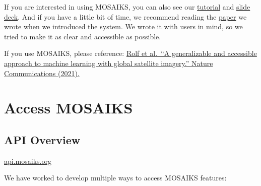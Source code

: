 \documentclass[
  letterpaper,
  DIV=11,
  numbers=noendperiod]{scrreprt}
\begin{document}
If you are interested in using MOSAIKS, you can also see our
\href{https://youtu.be/ux2c-ot3Ce0?feature=shared}{tutorial} and
\href{https://www.dropbox.com/scl/fi/m46kn8jvnab5cra5e9ebz/NBER_MOSAIKS_2021.pdf?rlkey=xsi0fyg4dksugzwcgqslz4vu2\&e=1\&dl=0}{slide
deck}. And if you have a little bit of time, we recommend reading the
\href{https://www.nature.com/articles/s41467-021-24638-z}{paper} we
wrote when we introduced the system. We wrote it with users in mind, so
we tried to make it as clear and accessible as possible.

If you use MOSAIKS, please reference:
\href{https://www.nature.com/articles/s41467-021-24638-z}{Rolf et
al.~``A generalizable and accessible approach to machine learning with
global satellite imagery.'' Nature Communications (2021).}

\hypertarget{access-mosaiks}{%
\chapter{Access MOSAIKS}\label{access-mosaiks}}

\hypertarget{api-overview}{%
\section{API Overview}\label{api-overview}}

\begin{tcolorbox}[enhanced jigsaw, opacityback=0, left=2mm, leftrule=.75mm, colback=white, opacitybacktitle=0.6, colbacktitle=quarto-callout-tip-color!10!white, toprule=.15mm, arc=.35mm, toptitle=1mm, colframe=quarto-callout-tip-color-frame, bottomrule=.15mm, coltitle=black, bottomtitle=1mm, rightrule=.15mm, titlerule=0mm, title=\textcolor{quarto-callout-tip-color}{\faLightbulb}\hspace{0.5em}{MOSAIKS API Link}, breakable]

\href{https://api.mosaiks.org/}{api.mosaiks.org}

\end{tcolorbox}

We have worked to develop multiple ways to access MOSAIKS features:
\end{document}
